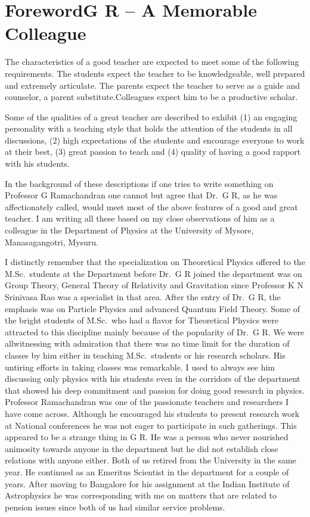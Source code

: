 \chapter*{Foreword\break G R – A Memorable Colleague}

\smallskip

The characteristics of a good teacher are expected to meet some of the following requirements. The students expect the teacher to be knowledgeable, well prepared and extremely articulate. The parents expect the teacher to serve as a guide and counselor, a parent substitute.\break Colleagues expect him to be a productive scholar.

Some of the qualities of a great teacher are described to exhibit (1) an engaging personality with a teaching style that holds the attention of the students in all discussions, (2) high expectations of the students and encourage everyone to work at their best, (3) great  passion to teach and  (4) quality of having a good rapport with his students.

In the background of these descriptions if one tries to write something on Professor G Ramachandran one cannot but agree that Dr.\ G R, as he was affectionately called, would meet most of the above features of a good and great teacher. I am writing all these based on my close observations of him as a colleague in the Department of Physics at the University of Mysore, Manasagangotri, Mysuru.

I distinctly remember that the specialization on Theoretical Physics offered to the M.Sc.\ students at the Department before Dr.\ G R joined the department was on Group Theory, General Theory of Relativity and Gravitation since Professor K N Srinivasa Rao was a specialist in that area. After the entry of Dr.\ G R, the emphasis was on Particle Physics and advanced Quantum Field Theory. Some of the bright students of M.Sc.\ who had a flavor for Theoretical Physics were attracted to this discipline mainly because of the popularity of Dr.\ G R. We were all\break witnessing with admiration that there was no time limit for the duration of classes by him either in teaching M.Sc.\ students or his research scholars. His untiring efforts in taking classes was remarkable. I used to always see him discussing only physics with his students even in the corridors of the department that showed his deep commitment and passion for doing good research in physics.  Professor Ramachandran was one of the passionate teachers and researchers I have come across. Although he encouraged his students to present research work at National conferences he was not eager to participate in such gatherings. This appeared to be a strange thing in G R.  He was a person who never nourished animosity towards anyone in the department but he did not establish close relations with anyone either. Both of us retired from the University in the same year. He continued as an Emeritus Scientist in the department for a couple of years. After moving to Bangalore for his assignment at the Indian Institute of Astrophysics he was corresponding with me on matters that are related to pension issues since both of us had similar service problems.

